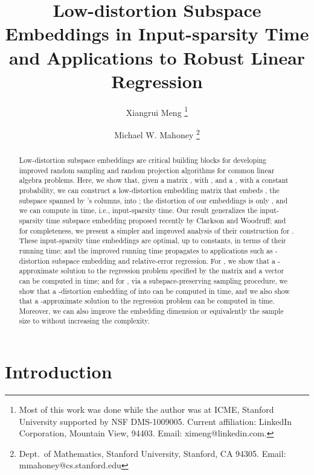\documentclass[11pt]{article}
\begin{document}
\title{Low-distortion Subspace Embeddings in Input-sparsity Time \\ and
  Applications to Robust Linear Regression }

\author{
  Xiangrui Meng
  \thanks{
    Most of this work was done while the author was at 
    ICME, Stanford University supported by NSF DMS-1009005.
    Current affiliation: LinkedIn Corporation,
    Mountain View, 94403.
    Email: ximeng@linkedin.com.
  }
  \and
  Michael W. Mahoney
  \thanks{
    Dept.\ of Mathematics,
    Stanford University,
    Stanford, CA 94305.
    Email: mmahoney@cs.stanford.edu
  }
}

\date{}
\maketitle




\begin{abstract}\noindent
Low-distortion subspace embeddings are critical building blocks for developing
improved random sampling and random projection algorithms for common linear
algebra problems.
Here, we show that, given a matrix , with , and
a , with a constant probability, we can construct a low-distortion
embedding matrix  that embeds , the
 subspace spanned by 's columns, into ; the distortion of our embeddings is only , and
we can compute  in  time, i.e., input-sparsity time.
Our result generalizes the input-sparsity time  subspace embedding
proposed recently by Clarkson and Woodruff; and for completeness, we present a
simpler and improved analysis of their construction for .
These input-sparsity time  embeddings are optimal, up to constants, in
terms of their running time; and the improved running time propagates to
applications such as -distortion  subspace embedding
and relative-error  regression.
For , we show that a -approximate solution to the 
regression problem specified by the matrix  and a vector  can be
computed in  time; and for
, via a subspace-preserving sampling procedure, we show that a -distortion embedding of  into  can be
computed in  time, and we also show that a
-approximate solution to the  regression problem  can be computed in  time.
Moreover, we can also improve the embedding dimension or equivalently the sample
size to  without increasing the
complexity.
\end{abstract}


\section{Introduction}
\label{sxn:intro}
\end{document}
